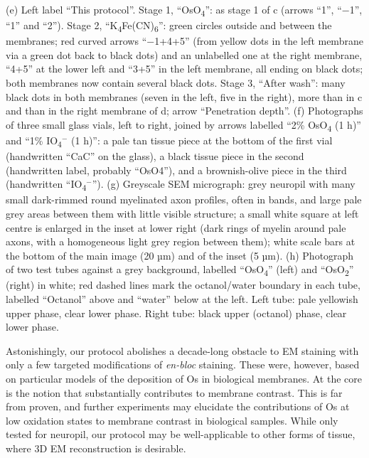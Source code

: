 \documentclass{article}
\begin{document}
{(e) Left label ``This protocol''. Stage 1, ``OsO\textsubscript{4}'': as stage 1 of c (arrows ``1'', ``−1'', ``1'' and ``2''). Stage 2, ``K\textsubscript{4}Fe(CN)\textsubscript{6}'': green circles outside and between the membranes; red curved arrows ``−1+4+5'' (from yellow dots in the left membrane via a green dot back to black dots) and an unlabelled one at the right membrane, ``4+5'' at the lower left and ``3+5'' in the left membrane, all ending on black dots; both membranes now contain several black dots. Stage 3, ``After wash'': many black dots in both membranes (seven in the left, five in the right), more than in c and than in the right membrane of d; arrow ``Penetration depth''.
(f) Photographs of three small glass vials, left to right, joined by arrows labelled ``2\% OsO\textsubscript{4} (1 h)'' and ``1\% IO\textsubscript{4}$^-$ (1 h)'': a pale tan tissue piece at the bottom of the first vial (handwritten ``CaC'' on the glass), a black tissue piece in the second (handwritten label, probably ``OsO4''), and a brownish-olive piece in the third (handwritten ``IO\textsubscript{4}$^-$'').
(g) Greyscale SEM micrograph: grey neuropil with many small dark-rimmed round myelinated axon profiles, often in bands, and large pale grey areas between them with little visible structure; a small white square at left centre is enlarged in the inset at lower right (dark rings of myelin around pale axons, with a homogeneous light grey region between them); white scale bars at the bottom of the main image (20 µm) and of the inset (5 µm).
(h) Photograph of two test tubes against a grey background, labelled ``OsO\textsubscript{4}'' (left) and ``OsO\textsubscript{2}'' (right) in white; red dashed lines mark the octanol/water boundary in each tube, labelled ``Octanol'' above and ``water'' below at the left. Left tube: pale yellowish upper phase, clear lower phase. Right tube: black upper (octanol) phase, clear lower phase.}

Astonishingly, our protocol abolishes a decade-long obstacle to EM staining with only a few targeted modifications of \emph{en-bloc} staining. These were, however, based on particular models of the deposition of Os in biological membranes. At the core is the notion that  substantially contributes to membrane contrast. This is far from proven, and further experiments may elucidate the contributions of Os at low oxidation states to membrane contrast in biological samples. While only tested for neuropil, our protocol may be well-applicable to other forms of tissue, where 3D EM reconstruction is desirable.
\end{document}
